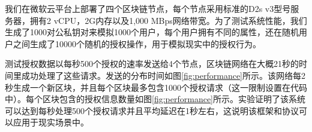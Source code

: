 我们在微软云平台上部署了四个区块链节点，每个节点采用标准的D2s v3型号服务器，拥有2 vCPU，2G内存以及1,000 MBps网络带宽。为了测试系统性能，我们生成了1000对公私钥对来模拟1000个用户，每个用户拥有不同的属性，还在随机用户之间生成了10000个随机的授权操作，用于模拟现实中的授权行为。

测试授权数据以每秒500个授权的速率发送给4个节点，区块链网络在大概21秒的时间里成功处理了这些请求。发送的分布时间如图\ref{fig:performance}所示。该网络每2秒生成一个新区块，并且每个区块最多包含1000个授权请求（这一限制设置在代码中）。每个区块包含的授权信息数量如图\ref{fig:performance}所示。实验证明了该系统可以达到每秒处理500个授权请求并且平均延迟在1秒左右，这说明该框架和协议可以应用于现实场景中。